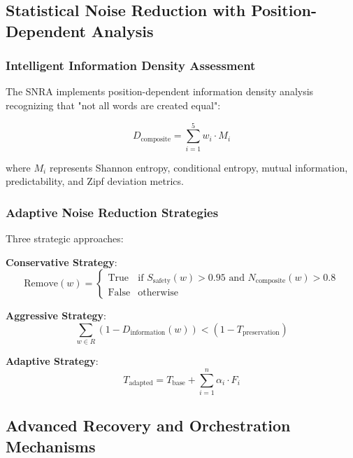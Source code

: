 \documentclass[12pt,a4paper]{article}
\begin{document}
\subsection{Statistical Noise Reduction with Position-Dependent Analysis}

\subsubsection{Intelligent Information Density Assessment}

The SNRA implements position-dependent information density analysis recognizing that "not all words are created equal":

\begin{equation}
D_{\text{composite}} = \sum_{i=1}^{5} w_i \cdot M_i
\end{equation}

where $M_i$ represents Shannon entropy, conditional entropy, mutual information, predictability, and Zipf deviation metrics.

\subsubsection{Adaptive Noise Reduction Strategies}

Three strategic approaches:

\textbf{Conservative Strategy}:
\begin{equation}
\text{Remove}(w) = \begin{cases}
\text{True} & \text{if } S_{\text{safety}}(w) > 0.95 \text{ and } N_{\text{composite}}(w) > 0.8 \\
\text{False} & \text{otherwise}
\end{cases}
\end{equation}

\textbf{Aggressive Strategy}:
\begin{equation}
\sum_{w \in R} (1 - D_{\text{information}}(w)) < (1 - T_{\text{preservation}})
\end{equation}

\textbf{Adaptive Strategy}:
\begin{equation}
T_{\text{adapted}} = T_{\text{base}} + \sum_{i=1}^{n} \alpha_i \cdot F_i
\end{equation}

\subsection{Advanced Recovery and Orchestration Mechanisms}
\end{document}
